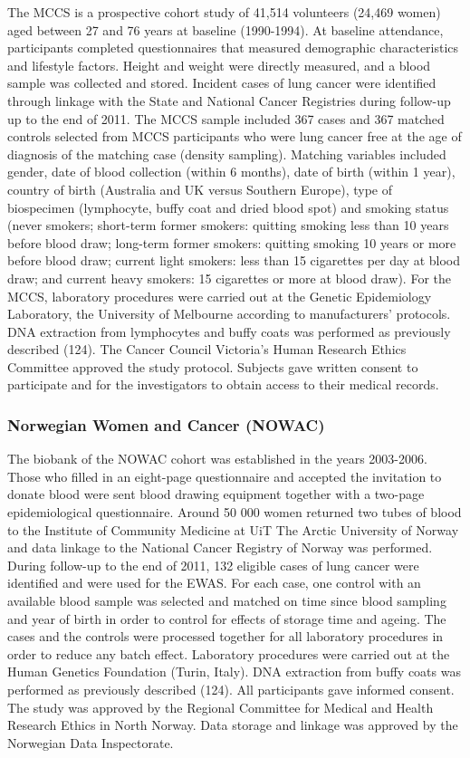 \documentclass[11pt,oneside]{bristolthesis}
\begin{document}
The MCCS is a prospective cohort study of 41,514 volunteers (24,469 women) aged between 27 and 76 years at baseline (1990-1994). At baseline attendance, participants completed questionnaires that measured demographic characteristics and lifestyle factors. Height and weight were directly measured, and a blood sample was collected and stored. Incident cases of lung cancer were identified through linkage with the State and National Cancer Registries during follow-up up to the end of 2011. The MCCS sample included 367 cases and 367 matched controls selected from MCCS participants who were lung cancer free at the age of diagnosis of the matching case (density sampling). Matching variables included gender, date of blood collection (within 6 months), date of birth (within 1 year), country of birth (Australia and UK versus Southern Europe), type of biospecimen (lymphocyte, buffy coat and dried blood spot) and smoking status (never smokers; short-term former smokers: quitting smoking less than 10 years before blood draw; long-term former smokers: quitting smoking 10 years or more before blood draw; current light smokers: less than 15 cigarettes per day at blood draw; and current heavy smokers: 15 cigarettes or more at blood draw). For the MCCS, laboratory procedures were carried out at the Genetic Epidemiology Laboratory, the University of Melbourne according to manufacturers' protocols. DNA extraction from lymphocytes and buffy coats was performed as previously described (124). The Cancer Council Victoria's Human Research Ethics Committee approved the study protocol. Subjects gave written consent to participate and for the investigators to obtain access to their medical records.

\hypertarget{norwegian-women-and-cancer-nowac}{%
\subsubsection{Norwegian Women and Cancer (NOWAC)}\label{norwegian-women-and-cancer-nowac}}

The biobank of the NOWAC cohort was established in the years 2003-2006. Those who filled in an eight-page questionnaire and accepted the invitation to donate blood were sent blood drawing equipment together with a two-page epidemiological questionnaire. Around 50 000 women returned two tubes of blood to the Institute of Community Medicine at UiT The Arctic University of Norway and data linkage to the National Cancer Registry of Norway was performed. During follow-up to the end of 2011, 132 eligible cases of lung cancer were identified and were used for the EWAS. For each case, one control with an available blood sample was selected and matched on time since blood sampling and year of birth in order to control for effects of storage time and ageing. The cases and the controls were processed together for all laboratory procedures in order to reduce any batch effect. Laboratory procedures were carried out at the Human Genetics Foundation (Turin, Italy). DNA extraction from buffy coats was performed as previously described (124). All participants gave informed consent. The study was approved by the Regional Committee for Medical and Health Research Ethics in North Norway. Data storage and linkage was approved by the Norwegian Data Inspectorate.
\end{document}

